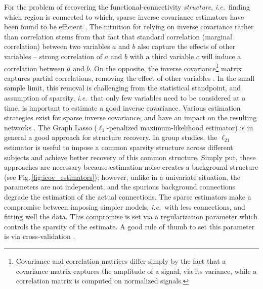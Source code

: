 \documentclass[5p]{elsarticle}
\begin{document}
For the problem of recovering the functional-connectivity
\emph{structure}, \emph{i.e.}\ finding which region is connected to
which, sparse inverse covariance estimators have been found to be
efficient \cite{varoquaux2010c, smith2011}. The intuition for relying on
inverse covariance rather than correlation stems from that fact that
standard correlation (marginal correlation) between two variables $a$ and
$b$ also capture the effects of other variables -- strong correlation of
$a$ and $b$ with a third variable $c$ will induce a correlation between
$a$ and $b$. On the opposite, the inverse covariance\footnote{Covariance
and correlation matrices differ simply by the fact that a covariance
matrix captures the amplitude of a signal, via its variance, while a
correlation matrix is computed on normalized signals.}
matrix captures
partial correlations, removing the effect of other variables
\cite{marrelec2006a}. In the small sample limit, this removal is
challenging from the statistical standpoint, and assumption of sparsity,
\emph{i.e.}\ that only few variables need to be considered at a time, is
important to estimate a good inverse covariance. Various estimation
strategies exist for sparse inverse covariance, and have an impact on the
resulting networks \cite{varoquaux2012,varoquaux2010c}. The
Graph Lasso ($\ell_1$-penalized maximum-likelihood estimator)
\cite{friedman2008} is in general a good approach for structure recovery. In group studies,
the $\ell_{21}$ estimator \cite{varoquaux2010c,honorio2012} is useful to
impose a common sparsity structure across different subjects and achieve
better recovery of this common structure. Simply put, these approaches
are necessary because estimation noise creates a background structure
(see Fig.\,\ref{fig:icov_estimators}); however, unlike in a univariate situation, the
parameters are not independent, and the spurious background connections
degrade the estimation of the actual connections. The sparse estimators
make a compromise between imposing simpler models, \emph{i.e.}\ with less
connections, and fitting well the data. This compromise is set via a
regularization parameter which controls the sparsity of the estimate. A
good rule of thumb to set this parameter is via cross-validation
\cite{varoquaux2010c}.

\end{document}
